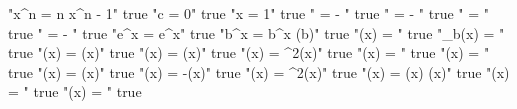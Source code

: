 "x^n = n x^{n - 1}" true
"c = 0" true
"x = 1" true
" = - " true
" = - " true
" = " true
" = - " true
"e^x = e^x" true
"b^x = b^x \ln(b)" true
"\ln(x) = " true
"\log_b(x) = " true
"\sinh(x) = \cosh(x)" true
"\cosh(x) = \sinh(x)" true
"\tanh(x) = ^2(x)" true
"(x) = " true
"(x) = " true
"\sin(x) = \cos(x)" true
"\cos(x) = -\sin(x)" true
"\tan(x) = \sec^2(x)" true
"\sec(x) = \tan(x) \sec(x)" true
"\arcsin(x) = " true
"\arctan(x) = " true
